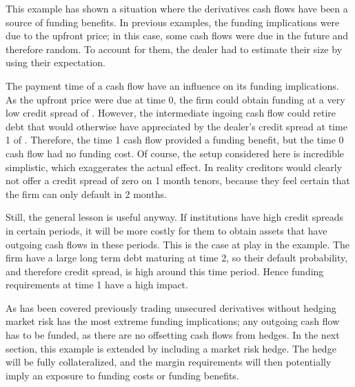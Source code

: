 \documentclass[main.tex]{subfiles}
\begin{document}
            This example has shown a situation where the derivatives cash flows have
            been a source of funding benefits.
            In previous examples, the funding implications were due to the upfront price;
            in this case, some cash flows were due in the future and therefore random.
            To account for them, the dealer had to estimate their size by using their expectation.

            The payment time of a cash flow have an influence on its funding implications.
            As the upfront price were due at time 0, 
            the firm could obtain funding at a very low credit spread of .
            However, the intermediate ingoing cash flow could retire debt
            that would otherwise have appreciated 
            by the dealer's credit spread at time 1 of .
            Therefore, the time 1 cash flow provided a funding benefit,
            but the time 0 cash flow had no funding cost.
            Of course, the setup considered here is incredible simplistic,
            which exaggerates the actual effect.
            In reality creditors would clearly not offer a credit spread of zero on 1 month tenors,
            because they feel certain that the firm can only default in 2 months.

            Still, the general lesson is useful anyway.
            If institutions have high credit spreads in certain periods,
            it will be more costly for them to obtain assets 
            that have outgoing cash flows in these periods.
            This is the case at play in the example.
            The firm have a large long term debt maturing at time 2, 
            so their default probability, and therefore credit spread,
            is high around this time period.
            Hence funding requirements at time 1 have a high impact.

            As has been covered previously trading unsecured derivatives without hedging market risk
            has the most extreme funding implications;
            any outgoing cash flow has to be funded, 
            as there are no offsetting cash flows from hedges.
            In the next section, this example is extended by including a market risk hedge.
            The hedge will be fully collateralized, 
            and the margin requirements will then potentially imply 
            an exposure to funding costs or funding benefits.
\end{document}

